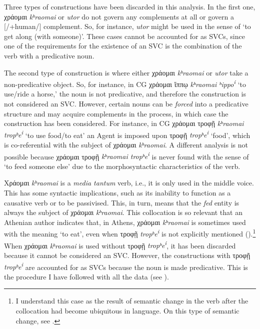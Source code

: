 \documentclass[output=paper,colorlinks,citecolor=brown]{langscibook}
\begin{document}
Three types of constructions have been discarded in this analysis. In the first one,
χράομαι \emph{kʰraomai} or \emph{utor} do not govern any complements at
all or govern a {[}/+human/{]} complement. So, for instance, \emph{utor} might be used in
the sense of `to get along (with someone)'. These cases cannot be accounted for as
SVCs, since one of the requirements for the existence of an SVC is the combination of the
verb with a predicative noun.

The second type of construction is where either χράομαι \emph{kʰraomai}
or \emph{utor} take a non-predicative object. So, for instance, in CG χράομαι ἵππῳ
\emph{kʰraomai ʰippo\textsuperscript{i}} `to use/ride
a horse,' the noun is not predicative, and therefore the construction is not considered an
SVC. However, certain nouns can be \emph{forced} into a predicative structure and may
acquire complements in the process, in which case the construction has been considered.
For instance, in CG χράομαι τροφῇ \emph{kʰraomai
  tropʰe\textsuperscript{i}} `to use food/to eat' an Agent is imposed
upon τροφῇ \emph{tropʰe\textsuperscript{i}} `food', which is
co-referential with the subject of χράομαι \emph{kʰraomai}. A different
analysis is not possible because χράομαι τροφῇ \emph{kʰraomai
  tropʰe\textsuperscript{i}} is never found with the sense of `to feed
someone else' due to the morphosyntactic characteristics of the verb.

Χράομαι \emph{kʰraomai} is a \emph{media tantum} verb, i.e., it
is only used in the middle voice. This has some syntactic implications, such as its
inability to function as a causative verb or to be passivised. This, in turn, means that
the \emph{fed} entity is always the subject of χράομαι \emph{kʰraomai}.
This collocation is so relevant that an Athenian author indicates that, in Athens, χράομαι
\emph{kʰraomai} is sometimes used with the meaning `to eat', even when
τροφῇ \emph{tropʰe\textsuperscript{i}} is not explicitly mentioned ().\footnote{I understand this case as the result of semantic change in
  the verb after the collocation had become ubiquitous in language. On this type of
  semantic change, see \citet{jimenez_martinez_collocations_nodate}.} When χράομαι
\emph{kʰraomai} is used without τροφῇ
\emph{tropʰe\textsuperscript{i}}, it has been discarded because it
cannot be considered an SVC. However, the constructions with τροφῇ
\emph{tropʰe\textsuperscript{i }}are accounted for as SVCs because the
noun is made predicative. This is the procedure I have followed with all the data (see
\citet{madrigal_acero_dataset_2024}).
\end{document}
